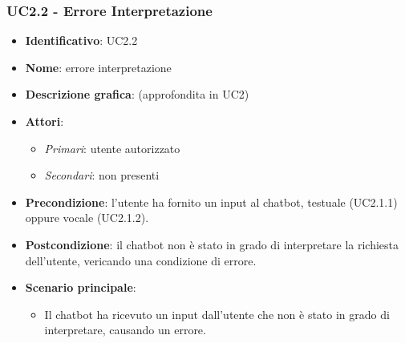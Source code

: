 \subsubsection{UC2.2 - Errore Interpretazione}
\begin{itemize}
    \item \textbf{Identificativo}: UC2.2
    \item \textbf{Nome}: errore interpretazione
    \item \textbf{Descrizione grafica}: (approfondita in UC2)
    \item \textbf{Attori}:
    \begin{itemize} 
        \item \textit{Primari}: utente autorizzato
        \item \textit{Secondari}: non presenti
    \end{itemize}
        \item \textbf{Precondizione}: l'utente ha fornito un input al chatbot, testuale (UC2.1.1) oppure vocale (UC2.1.2). 
        \item \textbf{Postcondizione}: il chatbot non è stato in grado di interpretare la richiesta dell'utente, vericando una condizione di errore. 
     \item \textbf{Scenario principale}: 
        \begin{itemize}
            \item Il chatbot ha ricevuto un input dall'utente che non è stato in grado di interpretare, causando un errore. 
        \end{itemize}
\end{itemize}


\newpage